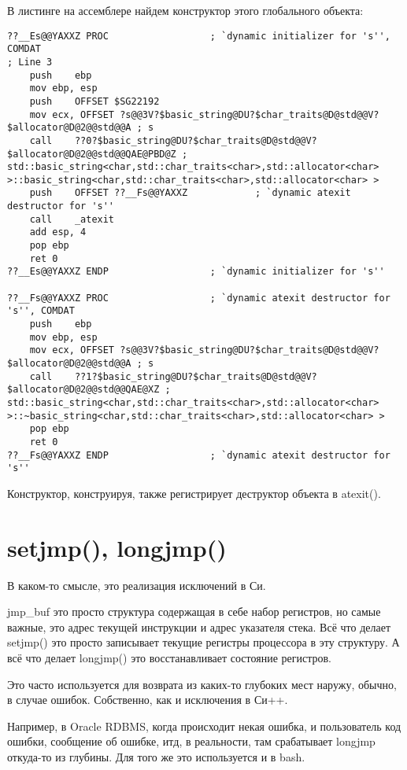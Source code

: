 В листинге на ассемблере найдем конструктор этого глобального объекта:

\begin{lstlisting}[caption=MSVC 2010]
??__Es@@YAXXZ PROC					; `dynamic initializer for 's'', COMDAT
; Line 3
	push	ebp
	mov	ebp, esp
	push	OFFSET $SG22192
	mov	ecx, OFFSET ?s@@3V?$basic_string@DU?$char_traits@D@std@@V?$allocator@D@2@@std@@A ; s
	call	??0?$basic_string@DU?$char_traits@D@std@@V?$allocator@D@2@@std@@QAE@PBD@Z ; std::basic_string<char,std::char_traits<char>,std::allocator<char> >::basic_string<char,std::char_traits<char>,std::allocator<char> >
	push	OFFSET ??__Fs@@YAXXZ			; `dynamic atexit destructor for 's''
	call	_atexit
	add	esp, 4
	pop	ebp
	ret	0
??__Es@@YAXXZ ENDP					; `dynamic initializer for 's''

??__Fs@@YAXXZ PROC					; `dynamic atexit destructor for 's'', COMDAT
	push	ebp
	mov	ebp, esp
	mov	ecx, OFFSET ?s@@3V?$basic_string@DU?$char_traits@D@std@@V?$allocator@D@2@@std@@A ; s
	call	??1?$basic_string@DU?$char_traits@D@std@@V?$allocator@D@2@@std@@QAE@XZ ; std::basic_string<char,std::char_traits<char>,std::allocator<char> >::~basic_string<char,std::char_traits<char>,std::allocator<char> >
	pop	ebp
	ret	0
??__Fs@@YAXXZ ENDP					; `dynamic atexit destructor for 's''
\end{lstlisting}

Конструктор, конструируя, также регистрирует деструктор объекта в atexit().



\section{setjmp(), longjmp()}

В каком-то смысле, это реализация исключений в Си.

jmp\_buf это просто структура содержащая в себе набор регистров, но самые важные, это адрес текущей инструкции
и адрес указателя стека.
Всё что делает setjmp() это просто записывает текущие регистры процессора в эту структуру.
А всё что делает longjmp() это восстанавливает состояние регистров.

Это часто используется для возврата из каких-то глубоких мест наружу, обычно, в случае ошибок.
Собственно, как и исключения в Си++.

Например, в Oracle RDBMS, когда происходит некая ошибка, и пользователь код ошибки, сообщение об ошибке, итд,
в реальности, там срабатывает longjmp откуда-то из глубины. Для того же это используется и в bash.

